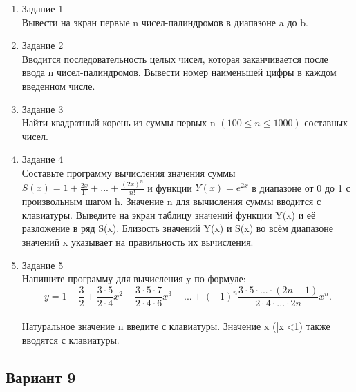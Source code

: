 \documentclass[a4paper]{article}
\begin{document}
	\begin{enumerate} 
		\item Задание 1 \\
			Вывести на экран первые n чисел-палиндромов в диапазоне a до b.\\
		\item Задание 2\\
			Вводится последовательность целых чисел, которая заканчивается после ввода n чисел-палиндромов. 
			Вывести номер наименьшей цифры в каждом введенном числе.\\
		\item Задание 3 \\
			Найти квадратный корень из суммы первых n $(100 \le n \le 1000) $ составных чисел.\\
		\item Задание 4 \\ 
			Составьте программу вычисления значения суммы  $S(x)=1+\frac{2x}{1!}+...+\frac{(2x)^n}{n!}$
			и функции $Y(x)=e^{2x}$ в диапазоне от 0 до 1
			с произвольным шагом h. Значение n для вычисления суммы вводится с клавиатуры. Выведите на экран таблицу значений функции Y(x) и её разложение в ряд S(x). Близость значений Y(x) и S(x) во всём диапазоне
			значений x указывает на правильность их вычисления.\\
		\item Задание 5 \\
			Напишите программу для вычисления y по формуле:\\
			$$y=1-\frac{3}{2}+\frac{3\cdot5}{2\cdot4}x^2-\frac{3\cdot5\cdot7}{2\cdot4\cdot6}x^3+...+(-1)^n\frac{3\cdot5\cdot...\cdot(2n+1)}{2\cdot4\cdot...\cdot2n}x^n.$$\\
			Натуральное значение n введите с клавиатуры. Значение x (|x|<1) также вводятся с клавиатуры.\\
	\end{enumerate}
	
	\newpage
	\begin{center}
		\subsection*{Вариант 9}
	\end{center}
	
\end{document}
